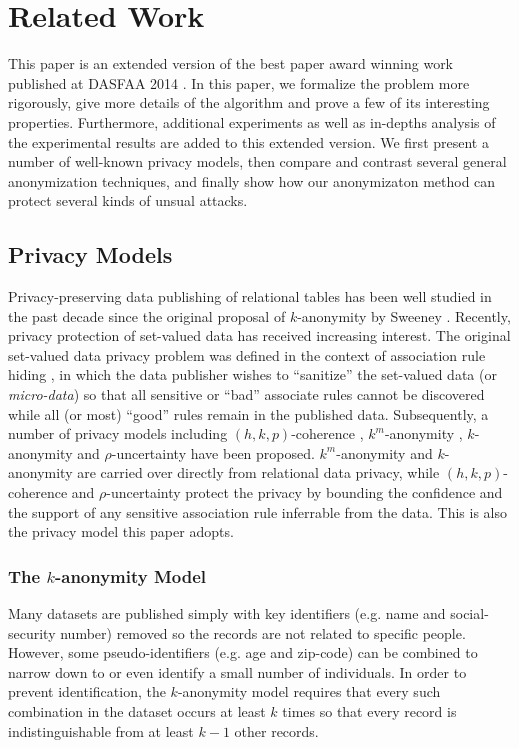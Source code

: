 \section{Related Work}
\label{sec:related}
This paper is an extended version of the best
paper award winning work published at DASFAA 2014 \cite{JiaPXZL14}.
In this paper, we formalize the problem more rigorously,
give more details of the algorithm and prove a few of its
interesting properties. Furthermore, additional
experiments as well as in-depths analysis of the experimental results
are added to this extended version. We first present a number
of well-known privacy models, then compare and contrast several general
anonymization techniques, and finally show how our anonymizaton method
can protect several kinds of unsual attacks.

\subsection{Privacy Models}

Privacy-preserving data publishing of relational tables has been well
studied in the past decade since the original proposal of $k$-anonymity by
Sweeney \etal \cite{Sweeney2002:k-anonymity}.
Recently, privacy protection of set-valued data has received increasing
interest. The original set-valued data privacy problem was defined in the
context of association rule hiding
\cite{atallah99:disclosure,tkde:VerykiosEBSD04:ARH,tkde:WuCC07:hiding},
in which the data publisher
wishes to ``sanitize'' the set-valued data (or {\em micro-data}) so that all
sensitive or ``bad'' associate rules cannot be discovered while all (or most)
``good'' rules remain in the published data.
Subsequently, a number of privacy models
including $(h,k,p)$-coherence \cite{Xu:2008:ATD},
$k^m$-anonymity \cite{Terrovitis:2008:PAS},
$k$-anonymity \cite{He:2009:ASD} and
$\rho$-uncertainty \cite{Cao:2010:rho} have been proposed.
$k^m$-anonymity and $k$-anonymity are carried over directly from
relational data privacy,
while $(h,k,p)$-coherence and $\rho$-uncertainty protect the
privacy by bounding the confidence and the support of
any sensitive association rule inferrable from the data. This is
also the privacy model this paper adopts.

\subsubsection{The $k$-anonymity Model}
Many datasets are published simply with key identifiers (e.g. name and
social-security number) removed so the records are not related to specific
people.  However, some pseudo-identifiers (e.g. age and zip-code) can be
combined to narrow down to or even identify a small number of individuals.
In order to prevent identification, the $k$-anonymity model requires that
every such combination in the dataset occurs at least $k$
times so that
every record is indistinguishable from at least $k-1$ other records.

